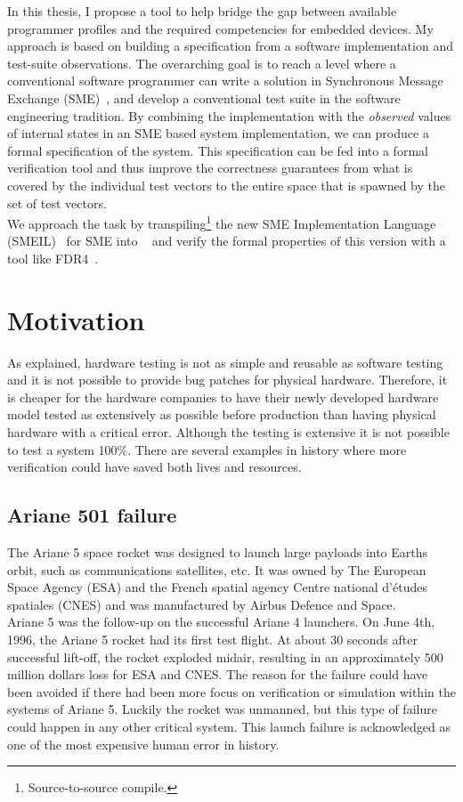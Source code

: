 In this thesis, I propose a tool to help bridge the gap between available programmer profiles and the required competencies for embedded devices. My approach is based on building a specification from a software implementation and test-suite observations. The overarching goal is to reach a level where a conventional software programmer can write a solution in Synchronous Message Exchange (SME)~\cite{Vinter2014, Vinter2015, Skovhede}, and develop a conventional test suite in the software engineering tradition. By combining the implementation with the \emph{observed} values of internal states in an SME based system implementation, we can produce a formal specification of the system. This specification can be fed into a formal verification tool and thus improve the correctness guarantees from what is covered by the individual test vectors to the entire space that is spawned by the set of test vectors.\\

We approach the task by transpiling\footnote{Source-to-source compile.} the new SME Implementation Language (SMEIL)~\cite{smeil} for SME into \cspm{}~\cite{Scattergood1998} and verify the formal properties of this version with a tool like FDR4~\cite{fdr}.
\section{Motivation}
As explained, hardware testing is not as simple and reusable as software testing and it is not possible to provide bug patches for physical hardware. Therefore, it is cheaper for the hardware companies to have their newly developed hardware model tested as extensively as possible before production than having physical hardware with a critical error. Although the testing is extensive it is not possible to test a system 100\%. There are several examples in history where more verification could have saved both lives and resources.
\subsection{Ariane 501 failure}
The Ariane 5 space rocket\cite{InquiryBoard1996} was designed to launch large payloads into Earths orbit, such as communications satellites, etc. It was owned by The European Space Agency (ESA) and the French spatial agency Centre national d'\'etudes spatiales (CNES) and was manufactured by Airbus Defence and Space.\\

Ariane 5 was the follow-up on the successful Ariane 4 launchers. On June 4th, 1996, the Ariane 5 rocket had its first test flight. At about 30 seconds after successful lift-off, the rocket exploded midair, resulting in an approximately 500 million dollars loss for ESA and CNES. The reason for the failure could have been avoided if there had been more focus on verification or simulation within the systems of Ariane 5. Luckily the rocket was unmanned, but this type of failure could happen in any other critical system. This launch failure is acknowledged as one of the most expensive human error in history. \\

